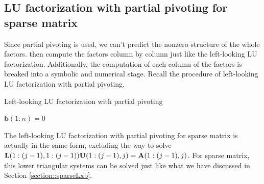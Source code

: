 \subsection{LU factorization with partial pivoting for sparse 
matrix}
\begin{alg}
    \label{alg::sparseLU}
    Since partial pivoting is used, we can't predict the 
    nonzero structure of the whole factors. \cite{Gilbert1988} 
    then compute the factors column by column just like the 
    left-looking LU factorization. Additionally, the 
    computation of each column of the factors is breaked into a 
    symbolic and numerical stage. Recall the procedure of 
    left-looking LU factorization with partial pivoting.
    \IncMargin{1em}
    \begin{algorithm}[H]
        \caption{Left-looking LU factorization with partial 
        pivoting}


        \BlankLine
        $\mathbf{b}(1:n)=0$\;
    \end{algorithm}
    \DecMargin{1em}
    The left-looking LU factorization with partial pivoting 
    for sparse matrix is actually in the same form, excluding 
    the way to solve ${\mathbf{L}}(1:(j-1),1:(j-1)){\mathbf{U}}(1:(j-1),j)=
    {\mathbf{A}}(1:(j-1),j)$. For sparse matrix, this lower triangular 
    systems can be solved just like what we have discussed in 
    Section \ref{section::sparseLxb}.
\end{alg}

